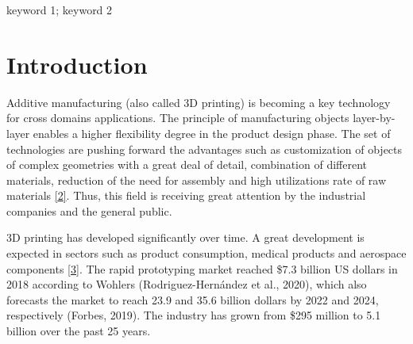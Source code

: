 \documentclass[conference,final,]{IEEEtran}
\begin{document}
\begin{IEEEkeywords}
keyword 1; keyword 2
\end{IEEEkeywords}




\maketitle


%
\IEEEpeerreviewmaketitle


\hypertarget{introduction}{%
\section{Introduction}\label{introduction}}

Additive manufacturing (also called 3D printing) is becoming a key
technology for cross domains applications. The principle of
manufacturing objects layer-by-layer enables a higher flexibility degree
in the product design phase. The set of technologies are pushing forward
the advantages such as customization of objects of complex geometries
with a great deal of detail, combination of different materials,
reduction of the need for assembly and high utilizations rate of raw
materials \protect\hyperlink{ref-Xiao2014}{{[}2{]}}. Thus, this field is
receiving great attention by the industrial companies and the general
public.

3D printing has developed significantly over time. A great development
is expected in sectors such as product consumption, medical products and
aerospace components \protect\hyperlink{ref-Peng2018}{{[}3{]}}. The
rapid prototyping market reached \$7.3 billion US dollars in 2018
according to Wohlers (Rodriguez-Hernández et al., 2020), which also
forecasts the market to reach 23.9 and 35.6 billion dollars by 2022 and
2024, respectively (Forbes, 2019). The industry has grown from \$295
million to 5.1 billion over the past 25 years.
\end{document}
